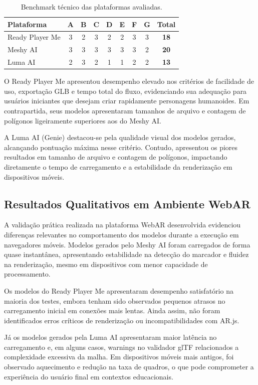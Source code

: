 \documentclass[conference]{IEEEtran}
\begin{document}
\begin{table}[ht]
\caption{Benchmark técnico das plataformas avaliadas.}
\label{tab:benchmark}
\centering
\begin{tabular}{lcccccccc}
\toprule
\textbf{Plataforma} & A & B & C & D & E & F & G & \textbf{Total} \\
\midrule
Ready Player Me & 3 & 2 & 3 & 2 & 2 & 3 & 3 & \textbf{18} \\
Meshy AI        & 3 & 3 & 3 & 3 & 3 & 3 & 2 & \textbf{20} \\
Luma AI         & 2 & 3 & 2 & 1 & 1 & 2 & 2 & \textbf{13} \\
\bottomrule
\end{tabular}
\end{table}


O Ready Player Me apresentou desempenho elevado nos critérios de facilidade de uso, exportação GLB e tempo total do fluxo, evidenciando sua adequação para usuários iniciantes que desejam criar rapidamente personagens humanoides. Em contrapartida, seus modelos apresentaram tamanhos de arquivo e contagem de polígonos ligeiramente superiores aos do Meshy AI.

A Luma AI (Genie) destacou-se pela qualidade visual dos modelos gerados, alcançando pontuação máxima nesse critério. Contudo, apresentou os piores resultados em tamanho de arquivo e contagem de polígonos, impactando diretamente o tempo de carregamento e a estabilidade da renderização em dispositivos móveis.

\subsection{Resultados Qualitativos em Ambiente WebAR}

A validação prática realizada na plataforma WebAR desenvolvida evidenciou diferenças relevantes no comportamento dos modelos durante a execução em navegadores móveis. Modelos gerados pelo Meshy AI foram carregados de forma quase instantânea, apresentando estabilidade na detecção do marcador e fluidez na renderização, mesmo em dispositivos com menor capacidade de processamento.

Os modelos do Ready Player Me apresentaram desempenho satisfatório na maioria dos testes, embora tenham sido observados pequenos atrasos no carregamento inicial em conexões mais lentas. Ainda assim, não foram identificados erros críticos de renderização ou incompatibilidades com AR.js.

Já os modelos gerados pela Luma AI apresentaram maior latência no carregamento e, em alguns casos, warnings no validador glTF relacionados a complexidade excessiva da malha. Em dispositivos móveis mais antigos, foi observado aquecimento e redução na taxa de quadros, o que pode comprometer a experiência do usuário final em contextos educacionais.
\end{document}
